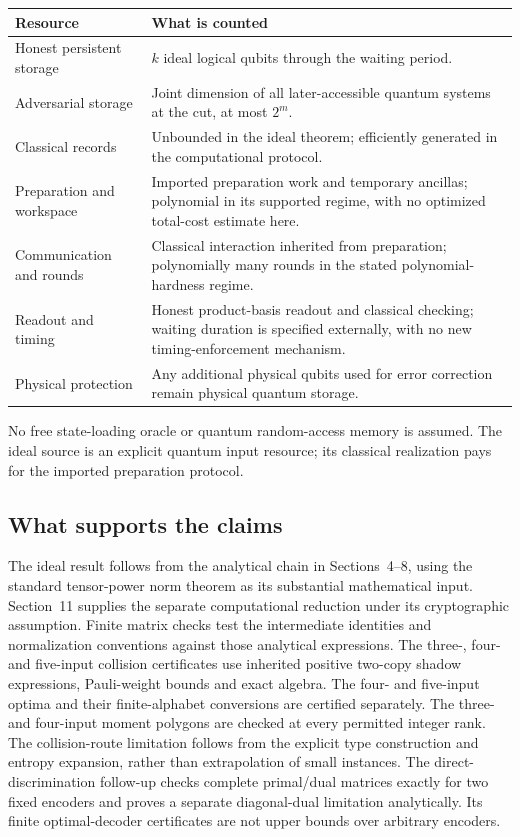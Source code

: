 \documentclass[11pt,a4paper]{article}
\begin{document}
\begin{center}\small
\renewcommand{\arraystretch}{1.13}
\begin{tabularx}{\linewidth}{@{}p{42mm}X@{}}\toprule
Resource & What is counted \\\midrule
Honest persistent storage & $k$ ideal logical qubits through the waiting period.\\
Adversarial storage & Joint dimension of all later-accessible quantum systems at the cut, at most $2^m$.\\
Classical records & Unbounded in the ideal theorem; efficiently generated in the computational protocol.\\
Preparation and workspace & Imported preparation work and temporary ancillas; polynomial in its supported regime, with no optimized total-cost estimate here.\\
Communication and rounds & Classical interaction inherited from preparation; polynomially many rounds in the stated polynomial-hardness regime.\\
Readout and timing & Honest product-basis readout and classical checking; waiting duration is specified externally, with no new timing-enforcement mechanism.\\
Physical protection & Any additional physical qubits used for error correction remain physical quantum storage.\\\bottomrule
\end{tabularx}
\end{center}

No free state-loading oracle or quantum random-access memory is assumed. The ideal source is an explicit quantum input resource; its classical realization pays for the imported preparation protocol.

\subsection{What supports the claims}
The ideal result follows from the analytical chain in Sections~4--8, using the standard tensor-power norm theorem as its substantial mathematical input. Section~11 supplies the separate computational reduction under its cryptographic assumption. Finite matrix checks test the intermediate identities and normalization conventions against those analytical expressions. The three-, four- and five-input collision certificates use inherited positive two-copy shadow expressions, Pauli-weight bounds and exact algebra. The four- and five-input optima and their finite-alphabet conversions are certified separately. The three- and four-input moment polygons are checked at every permitted integer rank. The collision-route limitation follows from the explicit type construction and entropy expansion, rather than extrapolation of small instances. The direct-discrimination follow-up checks complete primal/dual matrices exactly for two fixed encoders and proves a separate diagonal-dual limitation analytically. Its finite optimal-decoder certificates are not upper bounds over arbitrary encoders.
\end{document}
